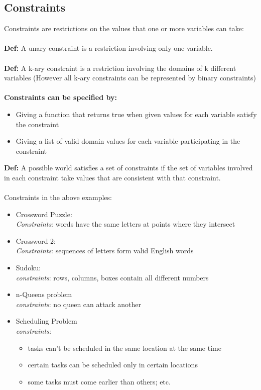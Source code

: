 \documentclass{article}
\def\blu#1{{\color{blu}#1}}
\theoremstyle{definition}
\begin{document}
\subsection*{Constraints}
Constraints are restrictions on the values that one or more variables can take: \\\\
\textbf{Def:} \blu{A unary constraint} is a restriction involving only one variable. \\\\
\textbf{Def:} \blu{A k-ary constraint} is a restriction involving the domains of k different variables (However all k-ary constraints can be represented by binary constraints) \\ \\
\textbf{Constraints can be specified by:}
\begin{itemize}
	\item Giving a function that returns true when given values for each variable satisfy the constraint
	\item Giving a list of valid domain values for each variable participating in the constraint
\end{itemize}
\textbf{Def:} A possible world satisfies a set of constraints if the set of variables involved in each constraint take values that are consistent with that constraint. \\ \\
Constraints in the above examples:
\begin{itemize}
	\item Crossword Puzzle: \\
	\textit{Constraints}: words have the same letters at points where they intersect
	\item Crossword 2: \\
	\textit{Constraints}: sequences of letters form valid English words
	\item Sudoku: \\
	\textit{constraints}: rows, columns, boxes contain all different numbers
	\item n-Queens problem \\
	\textit{constraints}: no queen can attack another
	\item Scheduling Problem \\
	\textit{constraints:}
	\begin{itemize}
		\item tasks can't be scheduled in the same location at the same time
		\item certain tasks can be scheduled only in certain locations
		\item some tasks must come earlier than others; etc.
	\end{itemize}
	
\end{itemize}
\end{document}
